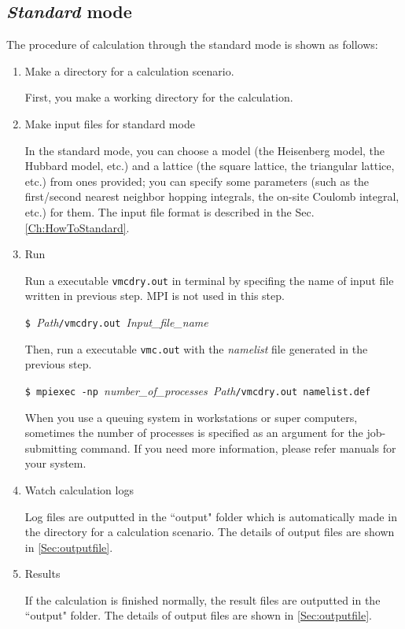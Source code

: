 \subsection{{\it Standard} mode}

The procedure of calculation through the standard mode is shown as follows:

\begin{enumerate}

\item  Make a directory for a calculation scenario. 

First, you make a working directory for the calculation.

\item  Make input files for standard mode

In the standard mode, you can choose a model (the Heisenberg model, the Hubbard model, etc.) and 
a lattice (the square lattice, the triangular lattice, etc.) from ones provided;
you can specify some parameters (such as the first/second nearest neighbor hopping integrals,
the on-site Coulomb integral, etc.) for them.
The input file format is described in the Sec. \ref{Ch:HowToStandard}.

\item  Run

Run a executable \verb|vmcdry.out| in terminal by specifing
the name of input file written in previous step.
MPI is not used in this step.

\verb|$ |\textit{Path}\verb|/vmcdry.out |\textit{Input\_file\_name}

Then, run a executable \verb|vmc.out| with 
the {\it namelist} file generated in the previous step.

\verb|$ mpiexec -np |\textit{number\_of\_processes}\verb| |\textit{Path}\verb|/vmcdry.out namelist.def|

When you use a queuing system in workstations or super computers, 
sometimes the number of processes is specified as an argument for the job-submitting command.
If you need more information, please refer manuals for your system. 

\item Watch calculation logs

Log files are outputted in the ``output" folder which is automatically made in the directory for a calculation scenario.
The details of output files are shown in \ref{Sec:outputfile}.

\item Results

If the calculation is finished normally, the result files are outputted in  the ``output" folder. The details of output files are shown in \ref{Sec:outputfile}.

\end{enumerate}

